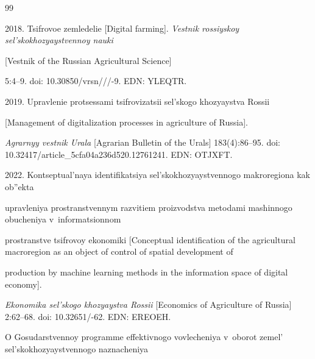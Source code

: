 {\small\frenchspacing

{ %


\begin{thebibliography}{99}



 2018. Tsif\-ro\-voe zem\-le\-de\-lie [Digital farming]. \textit{Vest\-nik ros\-siy\-skoy sel's\-ko\-kho\-zyayst\-ven\-noy nau\-ki} 

 [Vestnik of the Russian Agricultural Science] 

5:4--9. doi: 10.30850\!/\!vrsn\!/\!/\!/-9. EDN: YLEQTR.



 2019. Uprav\-le\-nie pro\-tses\-sa\-mi tsif\-ro\-vi\-za\-tsii sel's\-ko\-go kho\-zyayst\-va Ros\-sii 

 [Management of digitalization processes in agriculture of Russia]. 

 \textit{Agrarnyy vestnik Urala} [Agrarian Bulletin of the Urals] 183(4):86--95. doi: 10.32417\!/\!article\_5cfa04a236d520.12761241. EDN: OTJXFT.



2022. Kon\-tsep\-tu\-al'\-naya iden\-ti\-fi\-ka\-tsiya sel's\-ko\-kho\-zyayst\-ven\-no\-go mak\-ro\-re\-gi\-o\-na kak ob''\-ek\-ta 

uprav\-le\-niya pro\-stran\-st\-ven\-nym raz\-vi\-ti\-em pro\-iz\-vod\-st\-va me\-to\-da\-mi ma\-shin\-no\-go obuche\-niya v~in\-for\-ma\-tsi\-on\-nom 

pro\-stranst\-ve tsif\-ro\-voy eko\-no\-mi\-ki [Conceptual identification of the agricultural macroregion as an object of control of spatial development of

 production by machine learning methods in the information space of digital economy]. 

  \textit{Eko\-no\-mika sel's\-ko\-go kho\-zyayst\-va Ros\-sii} [Economics of Agriculture of Russia] 2:62--68. doi: 10.32651\!/-62. EDN: EREOEH.


O Gosudarstvennoy programme ef\-fek\-tiv\-no\-go vo\-vle\-che\-niya v~obo\-rot ze\-mel' sel's\-ko\-kho\-zyayst\-ven\-no\-go na\-zna\-che\-niya 


\end{thebibliography}}}
